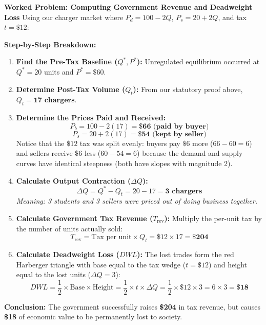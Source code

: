 \documentclass[11pt,letterpaper]{article}
\begin{document}
\noindent\textbf{Worked Problem: Computing Government Revenue and Deadweight Loss}
Using our charger market where $P_d = 100 - 2Q$, $P_s = 20 + 2Q$, and tax $t = \$12$:

\noindent\textbf{Step-by-Step Breakdown:}
\begin{enumerate}
    \item \textbf{Find the Pre-Tax Baseline ($Q^*, P^*$):}
    Unregulated equilibrium occurred at $Q^* = 20$ units and $P^* = \$60$.
    
    \item \textbf{Determine Post-Tax Volume ($Q_t$):}
    From our statutory proof above, $Q_t = \mathbf{17\text{ chargers}}$.
    
    \item \textbf{Determine the Prices Paid and Received:}
    \[
    P_b = 100 - 2(17) = \mathbf{\$66\text{ (paid by buyer)}}
    \]
    \[
    P_s = 20 + 2(17) = \mathbf{\$54\text{ (kept by seller)}}
    \]
    Notice that the $\$12$ tax was split evenly: buyers pay $\$6$ more ($66 - 60 = 6$) and sellers receive $\$6$ less ($60 - 54 = 6$) because the demand and supply curves have identical steepness (both have slopes with magnitude 2).
    
    \item \textbf{Calculate Output Contraction ($\Delta Q$):}
    \[
    \Delta Q = Q^* - Q_t = 20 - 17 = \mathbf{3\text{ chargers}}
    \]
    \emph{Meaning: 3 students and 3 sellers were priced out of doing business together.}
    
    \item \textbf{Calculate Government Tax Revenue ($T_{\text{rev}}$):}
    Multiply the per-unit tax by the number of units actually sold:
    \[
    T_{\text{rev}} = \text{Tax per unit} \times Q_t = \$12 \times 17 = \mathbf{\$204}
    \]
    
    \item \textbf{Calculate Deadweight Loss ($DWL$):}
    The lost trades form the red Harberger triangle with base equal to the tax wedge ($t = \$12$) and height equal to the lost units ($\Delta Q = 3$):
    \[
    DWL = \frac{1}{2} \times \text{Base} \times \text{Height} = \frac{1}{2} \times t \times \Delta Q = \frac{1}{2} \times \$12 \times 3 = 6 \times 3 = \mathbf{\$18}
    \]
\end{enumerate}
\textbf{Conclusion:} The government successfully raises \textbf{\$204} in tax revenue, but causes \textbf{\$18} of economic value to be permanently lost to society.
\end{document}
